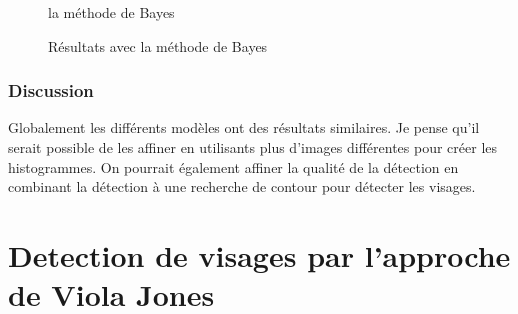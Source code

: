 \documentclass{article}
\begin{document}
\begin{figure}[h!]
  \centering
la méthode de Bayes
  \caption{Résultats avec la méthode de Bayes}
\end{figure}

\subsubsection{Discussion}

Globalement les différents modèles ont des résultats similaires. Je pense qu'il serait possible de les affiner en utilisants plus d'images différentes pour créer les histogrammes. On pourrait également affiner la qualité de la détection en combinant la détection à une recherche de contour pour détecter les visages.

\section{Detection de visages par l'approche de Viola Jones}
\end{document}

